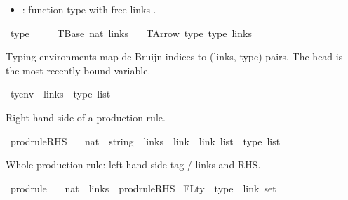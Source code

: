 \begin{isabellebody}
\begin{isamarkuptext}
\begin{itemize}
\item {} : function type  with free links .%
\end{itemize}%
\end{isamarkuptext}\isamarkuptrue%
\isamarkupfalse%
\ type\ {\isacharequal}{\kern0pt}\isanewline
\ \ \ \ TBase\ nat\ links\isanewline
\ \ {\isacharbar}{\kern0pt}\ TArrow\ type\ type\ links%
\begin{isamarkuptext}%
Typing environments map de Bruijn indices to (links, type) pairs.
  The head is the most recently bound variable.%
\end{isamarkuptext}\isamarkuptrue%
\isamarkupfalse%
\ tyenv\ {\isacharequal}{\kern0pt}\ {\isachardoublequoteopen}{\isacharparenleft}{\kern0pt}links\ {\isacharasterisk}{\kern0pt}\ type{\isacharparenright}{\kern0pt}\ list{\isachardoublequoteclose}%
\begin{isamarkuptext}%
Right-hand side of a production rule.%
\end{isamarkuptext}\isamarkuptrue%
\isamarkupfalse%
\ prodrule{\isacharunderscore}{\kern0pt}RHS\ {\isacharequal}{\kern0pt}\isanewline
\ \ {\isachardoublequoteopen}nat\ {\isacharasterisk}{\kern0pt}\ {\isacharparenleft}{\kern0pt}string\ {\isacharasterisk}{\kern0pt}\ links{\isacharparenright}{\kern0pt}\ {\isacharasterisk}{\kern0pt}\ {\isacharparenleft}{\kern0pt}link\ {\isacharasterisk}{\kern0pt}\ link{\isacharparenright}{\kern0pt}\ list\ {\isacharasterisk}{\kern0pt}\ type\ list{\isachardoublequoteclose}%
\begin{isamarkuptext}%
Whole production rule: left-hand side tag / links and RHS.%
\end{isamarkuptext}\isamarkuptrue%
\isamarkupfalse%
\ prodrule\ {\isacharequal}{\kern0pt}\isanewline
\ \ {\isachardoublequoteopen}{\isacharparenleft}{\kern0pt}nat\ {\isacharasterisk}{\kern0pt}\ links{\isacharparenright}{\kern0pt}\ {\isacharasterisk}{\kern0pt}\ prodrule{\isacharunderscore}{\kern0pt}RHS{\isachardoublequoteclose}\isanewline
\isanewline
\isanewline
{}\isamarkupfalse%
\ FLty\ {\isacharcolon}{\kern0pt}{\isacharcolon}{\kern0pt}\ {\isachardoublequoteopen}type\ {\isacharequal}{\kern0pt}{\isachargreater}{\kern0pt}\ link\ set{\isachardoublequoteclose}\ \isanewline

\end{isabellebody}
